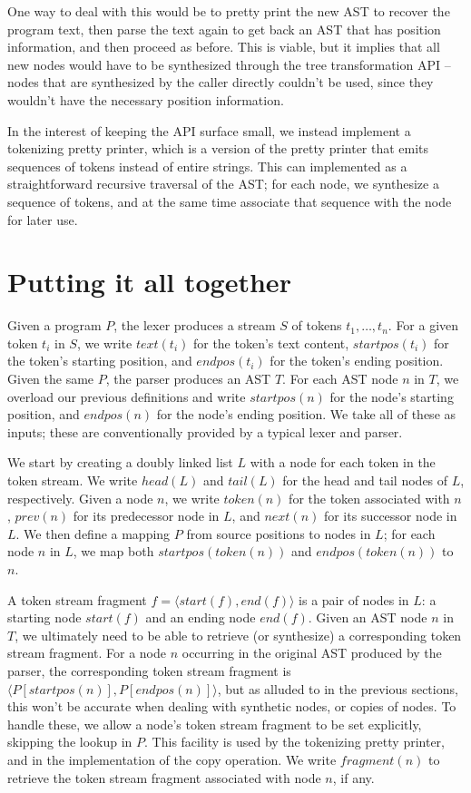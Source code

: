 One way to deal with this would be to pretty print the new AST to recover the
program text, then parse the text again to get back an AST that has position
information, and then proceed as before. This is viable, but it implies that
all new nodes would have to be synthesized through the tree transformation API
-- nodes that are synthesized by the caller directly couldn't be used, since
they wouldn't have the necessary position information.

In the interest of keeping the API surface small, we instead implement a
tokenizing pretty printer, which is a version of the pretty printer that emits
sequences of tokens instead of entire strings. This can implemented as a
straightforward recursive traversal of the AST; for each node, we synthesize a
sequence of tokens, and at the same time associate that sequence with the node
for later use.

\section{Putting it all together}

Given a program $P$, the lexer produces a stream $S$ of tokens $t_1, \dots,
t_n$. For a given token $t_i$ in $S$, we write $text(t_i)$ for the token's text
content, $startpos(t_i)$ for the token's starting position, and $endpos(t_i)$
for the token's ending position. Given the same $P$, the parser produces an AST
$T$. For each AST node $n$ in $T$, we overload our previous definitions and
write $startpos(n)$ for the node's starting position, and $endpos(n)$ for the
node's ending position. We take all of these as inputs; these are
conventionally provided by a typical lexer and parser.

We start by creating a doubly linked list $L$ with a node for each token in the
token stream. We write $head(L)$ and $tail(L)$ for the head and tail nodes of
$L$, respectively. Given a node $n$, we write $token(n)$ for the token
associated with $n$, $prev(n)$ for its predecessor node in $L$, and $next(n)$
for its successor node in $L$. We then define a mapping $P$ from source
positions to nodes in $L$; for each node $n$ in $L$, we map both
$startpos(token(n))$ and $endpos(token(n))$ to $n$.

A token stream fragment $f = \langle start(f), end(f) \rangle$ is a pair
of nodes in $L$: a starting node $start(f)$ and an ending node $end(f)$. Given
an AST node $n$ in $T$, we ultimately need to be able to retrieve (or
synthesize) a corresponding token stream fragment. For a node $n$ occurring in
the original AST produced by the parser, the corresponding token stream
fragment is $\langle P[startpos(n)], P[endpos(n)] \rangle$, but as alluded to
in the previous sections, this won't be accurate when dealing with synthetic
nodes, or copies of nodes. To handle these, we allow a node's token stream
fragment to be set explicitly, skipping the lookup in $P$. This facility is
used by the tokenizing pretty printer, and in the implementation of the copy
operation. We write $fragment(n)$ to retrieve the token stream fragment
associated with node $n$, if any.

